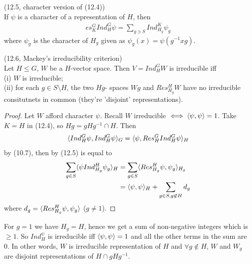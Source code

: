 \documentclass[a4paper]{article}
\begin{document}
\begin{coro} (12.5, character version of (12.4))\\
If $\psi$ is a character of a representation of $H$, then
\begin{equation*}
\begin{aligned}
es_K^G Ind_H^G \psi = \sum_{g \ni S} Ind_{H_g}^K \psi_g
\end{aligned}
\end{equation*}
where $\psi_g$ is the character of $H_g$ given as $\psi_g(x) = \psi(g^{-1} xg)$.
\end{coro}

\begin{coro} (12.6, Mackey's irreducibility criterion)\\
Let $H \leq G$, $W$ be a $H$-vector space. Then $V = Ind_H^G W$ is irreducible iff\\
(i) $W$ is irreducible;\\
(ii) for each $g \in S\setminus H$, the two $Hg$- spaces $Wg$ and $Res_{H_g}^H W$ have no irreducible consitutnets in common (they're 'disjoint' representations).
\begin{proof}
Let $W$ afford character $\psi$. Recall $W$ irreducible $\iff \langle \psi,\psi \rangle = 1$. Take $K=H$ in (12.4), so $Hg = gHg^{-1} \cap H$. Then
\begin{equation*}
\begin{aligned}
\langle Ind_H^G \psi,Ind_H^G \psi\rangle_G = \langle \psi,Res_H^G Ind_H^G \psi\rangle_H
\end{aligned}
\end{equation*}
by (10.7), then by (12.5) is equal to
\begin{equation*}
\begin{aligned}
\sum_{g \in S} \langle \psi Ind_{H_g}^H \psi_g\rangle_H &= \sum_{g \in S} \langle Res_{H_g}^H \psi, \psi_g\rangle_{H_g}\\
&= \langle \psi,\psi\rangle_H + \sum_{g \in S, g \not\in H} d_g
\end{aligned}
\end{equation*}
where $d_g = \langle Res_{H_g}^H \psi,\psi_g \rangle$ ($g \neq 1$).
\end{proof}
\end{coro}

For $g=1$ we have $H_g =H$, hence we get a sum of non-negative integers which is $\geq 1$. So $Ind_H^ \psi$ is irreducible iff $\langle\psi,\psi\rangle = 1$ and all the other terms in the sum are 0. In other words, $W$ is irreducible representation of $H$ and $\forall g \not\in H$, $W$ and $W_g$ are disjoint representations of $H \cap gHg^{-1}$.
\end{document}
